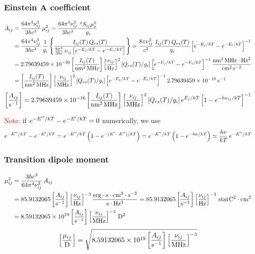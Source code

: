 \subsubsection*{Einstein A coefficient}
\begin{align*}
  A_{ij} &= \frac{64\pi^4\nu_{ij}^3}{3hc^3}\,\mu_{ij}^2
          = \frac{64\pi^4\nu_{ij}^3}{3hc^3}\,\frac{{}^{x}S_{ij}\mu_x^2}{g_i}\\
  &= \frac{64\pi^4\nu_{ij}^3}{3hc^3}\,\frac1{g_i}
     \left\{\frac{I_{ij}(T)\,Q_{rs}(T)}
                 {\frac{8\pi^3}{3hc}\,\nu_{ij}\left[e^{-E_j/kT}-e^{-E_i/kT}\right]}\right\}
   = \frac{8\pi\nu_{ij}^2}{c^2}\,\frac{I_{ij}(T)\,Q_{rs}(T)}{g_i}
     \left[e^{-E_j/kT}-e^{-E_i/kT}\right]^{-1}\\
  &= 2.79639459\times10^{-20}\left[\frac{I_{ij}(T)}{\mathrm{nm^2\,MHz}}\right]\left[\frac{\nu_{ij}}{\mathrm{Hz}}\right]^{2}
     \left[Q_{rs}(T)/g_i\right]\left[e^{-E_j/kT}-e^{-E_i/kT}\right]^{-1}
     \frac{\mathrm{nm^2\,MHz\cdot Hz^2}}{\mathrm{cm^2\,s^{-2}}}\\
  &= \left[\frac{I_{ij}(T)}{\mathrm{nm^2\,MHz}}\right]\left[\frac{\nu_{ij}}{\mathrm{MHz}}\right]^{2}
     \left[Q_{rs}(T)/g_i\right]\left[e^{-E_j/kT}-e^{-E_i/kT}\right]^{-1}
     2.79639459\times10^{-16}\,\mathrm{s^{-1}}
\end{align*}
\begin{equation*}
  \left[\frac{A_{ij}}{\mathrm{s^{-1}}}\right] = 2.79639459\times10^{-16}\left[\frac{I_{ij}(T)}{\mathrm{nm^2\,MHz}}\right]
     \left[\frac{\nu_{ij}}{\mathrm{MHz}}\right]^{2}\left[Q_{rs}(T)/g_i\right]e^{E_j/kT}
     \left[1-e^{-h\nu_{ij}/kT}\right]^{-1}
\end{equation*}

\noindent\textcolor{red}{Note:} if $e^{-E''/kT}-e^{-E'/kT}=0$ numerically, we use
\begin{equation*}
  e^{-E''/kT}-e^{-E'/kT} = e^{-E''/kT}\left(1-e^{-(E'-E'')/kT}\right)
                   = e^{-E''/kT}\left(1-e^{-h\nu/kT}\right)
                   \simeq \frac{h\nu}{kT}\,e^{-E''/kT}
\end{equation*}

\subsubsection*{Transition dipole moment}
\begin{align*}
  \mu_{ij}^2 &= \frac{3hc^3}{64\pi^4\nu_{ij}^3}\,A_{ij}\\
  &= 85.9132065\left[\frac{A_{ij}}{\mathrm{s^{-1}}}\right]\left[\frac{\nu_{ij}}{\mathrm{Hz}}\right]^{-3}
     \frac{\mathrm{erg\cdot s\cdot cm^3\cdot s^{-3}}}{\mathrm{s\cdot Hz^3}}
   = 85.9132065\left[\frac{A_{ij}}{\mathrm{s^{-1}}}\right]\left[\frac{\nu_{ij}}{\mathrm{Hz}}\right]^{-3}\,\mathrm{statC^2\cdot cm^2}\\
  &= 8.59132065\times10^{19}\left[\frac{A_{ij}}{\mathrm{s^{-1}}}\right]\left[\frac{\nu_{ij}}{\mathrm{MHz}}\right]^{-3}\,\mathrm{D^2}
\end{align*}
\begin{equation*}
  \left[\frac{\mu_{ij}}{\mathrm{D}}\right] = \sqrt{8.59132065\times10^{19}\left[\frac{A_{ij}}{\mathrm{s^{-1}}}\right]
                                \left[\frac{\nu_{ij}}{\mathrm{MHz}}\right]^{-3}}
\end{equation*}

